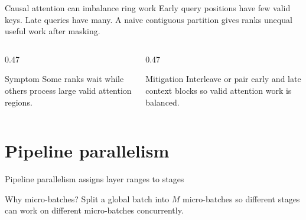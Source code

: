 \documentclass[handout]{beamer}
\begin{document}
\begin{frame}{Causal attention can imbalance ring work}
  Early query positions have few valid keys. Late queries have many. A naive contiguous partition gives ranks unequal useful work after masking.
  \begin{columns}[t]
    \begin{column}{0.47\linewidth}
      \begin{alertblock}{Symptom}
        Some ranks wait while others process large valid attention regions.
      \end{alertblock}
    \end{column}
    \begin{column}{0.47\linewidth}
      \begin{block}{Mitigation}
        Interleave or pair early and late context blocks so valid attention work is balanced.
      \end{block}
    \end{column}
  \end{columns}
\end{frame}

\section{Pipeline parallelism}

\begin{frame}{Pipeline parallelism assigns layer ranges to stages}
  \begin{center}
  \end{center}
  \begin{block}{Why micro-batches?}
    Split a global batch into $M$ micro-batches so different stages can work on different micro-batches concurrently.
  \end{block}
\end{frame}
\end{document}
